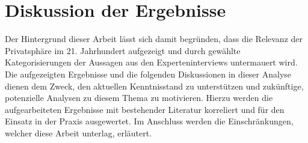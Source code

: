 \chapter{Diskussion der Ergebnisse} %
\label{Discussion} %
Der Hintergrund dieser Arbeit lässt sich damit begründen, dass die Relevanz der Privatsphäre im 21. Jahrhundert aufgezeigt und durch gewählte Kategorisierungen der Aussagen aus den
Experteninterviews untermauert wird. \newline
Die aufgezeigten Ergebnisse und die folgenden Diskussionen in dieser Analyse dienen dem Zweck, den aktuellen Kenntnisstand zu unterstützen und zukünftige, potenzielle Analysen zu diesem Thema zu motivieren. Hierzu werden die aufgearbeiteten Ergebnisse 
mit bestehender Literatur korreliert und für den Einsatz in der Praxis ausgewertet. Im Anschluss werden die Einschränkungen, welcher diese Arbeit unterlag, erläutert.

